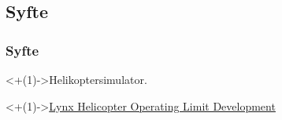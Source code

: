 \subsection{Syfte}

\begin{frame}[<+(1)->]
\frametitle{Syfte}

\uncover<+(1)->{Helikoptersimulator.}

\uncover<+(1)->{\href{http://www.youtube.com/watch?v=bC2XIGMI2kM}{Lynx Helicopter Operating Limit Development}}

\end{frame}
